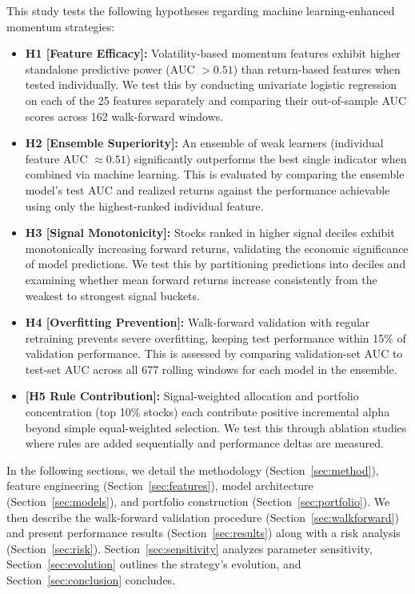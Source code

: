 \documentclass[conference]{IEEEtran}
\begin{document}
This study tests the following hypotheses regarding machine learning-enhanced momentum strategies:
\begin{itemize}
    \item \textbf{H1 [Feature Efficacy]:} Volatility-based momentum features exhibit higher standalone predictive power (AUC $> 0.51$) than return-based features when tested individually. We test this by conducting univariate logistic regression on each of the 25 features separately and comparing their out-of-sample AUC scores across 162 walk-forward windows.
    \item \textbf{H2 [Ensemble Superiority]:} An ensemble of weak learners (individual feature AUC $\approx 0.51$) significantly outperforms the best single indicator when combined via machine learning. This is evaluated by comparing the ensemble model's test AUC and realized returns against the performance achievable using only the highest-ranked individual feature.
    \item \textbf{H3 [Signal Monotonicity]:} Stocks ranked in higher signal deciles exhibit monotonically increasing forward returns, validating the economic significance of model predictions. We test this by partitioning predictions into deciles and examining whether mean forward returns increase consistently from the weakest to strongest signal buckets.
    \item \textbf{H4 [Overfitting Prevention]:} Walk-forward validation with regular retraining prevents severe overfitting, keeping test performance within 15\% of validation performance. This is assessed by comparing validation-set AUC to test-set AUC across all 677 rolling windows for each model in the ensemble.
    \item \textbf{[H5 Rule Contribution]:} Signal-weighted allocation and portfolio concentration (top 10\% stocks) each contribute positive incremental alpha beyond simple equal-weighted selection. We test this through ablation studies where rules are added sequentially and performance deltas are measured.
\end{itemize}

In the following sections, we detail the methodology (Section~\ref{sec:method}), feature engineering (Section~\ref{sec:features}), model architecture (Section~\ref{sec:models}), and portfolio construction (Section~\ref{sec:portfolio}). We then describe the walk-forward validation procedure (Section~\ref{sec:walkforward}) and present performance results (Section~\ref{sec:results}) along with a risk analysis (Section~\ref{sec:risk}). Section~\ref{sec:sensitivity} analyzes parameter sensitivity, Section~\ref{sec:evolution} outlines the strategy's evolution, and Section~\ref{sec:conclusion} concludes.
\end{document}
